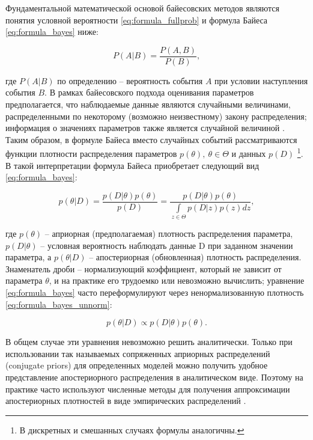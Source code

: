 \documentclass[a4paper,14pt]{extreport}
\begin{document}
Фундаментальной математической основой байесовских методов являются понятия условной вероятности \eqref{eq:formula_fullprob} и формула Байеса \eqref{eq:formula_bayes} ниже:

\begin{equation}
	P(A|B)=\frac{P(A,B)}{P(B)} ,
	\label{eq:formula_fullprob}
\end{equation}

\noindent
где $P(A|B)$ по определению -- вероятность события $A$ при условии наступления события $B$. В рамках байесовского подхода оценивания параметров предполагается, что наблюдаемые данные являются случайными величинами, распределенными по некоторому (возможно неизвестному) закону распределения; информация о значениях параметров также является случайной величиной \cite{intro_to_pp}. Таким образом, в формуле Байеса вместо случайных событий рассматриваются функции плотности распределения параметров $p(\theta), \: \theta \in \Theta$ и данных $p(D)$ \footnote{В дискретных и смешанных случаях формулы аналогичны. }. В такой интерпретации формула Байеса приобретает следующий вид \eqref{eq:formula_bayes}:

\begin{equation}
	p(\theta|D) = \frac{p(D|\theta) p(\theta)}{p(D)} = \frac{p(D|\theta) p(\theta)}{\int\limits_{z\in\Theta}{p(D|z)p(z)dz}} ,
	\label{eq:formula_bayes}
\end{equation}

\noindent
где $p(\theta)$ -- априорная (предполагаемая) плотность распределения параметра, $p(D|\theta)$ -- условная вероятность наблюдать данные D при заданном значении параметра, а $p(\theta|D)$ -- апостериорная (обновленная) плотность распределения. Знаменатель дроби -- нормализующий коэффициент, который не зависит от параметра $\theta$, и на практике его трудоемко или невозможно вычислить; уравнение \eqref{eq:formula_bayes} часто переформулируют через ненормализованную плотность \eqref{eq:formula_bayes_unnorm}:

\begin{equation}
	p(\theta|D) \propto p(D|\theta) p(\theta) .
	\label{eq:formula_bayes_unnorm}
\end{equation}

В общем случае эти уравнения невозможно решить аналитически. Только при использовании так называемых сопряженных априорных распределений (conjugate priors) для определенных моделей можно получить удобное представление апостериорного распределения в аналитическом виде. Поэтому на практике часто используют численные методы для получения аппроксимации апостериорных плотностей в виде эмпирических распределений \cite{intro_to_pp,stan_user_guide}.
\end{document}
